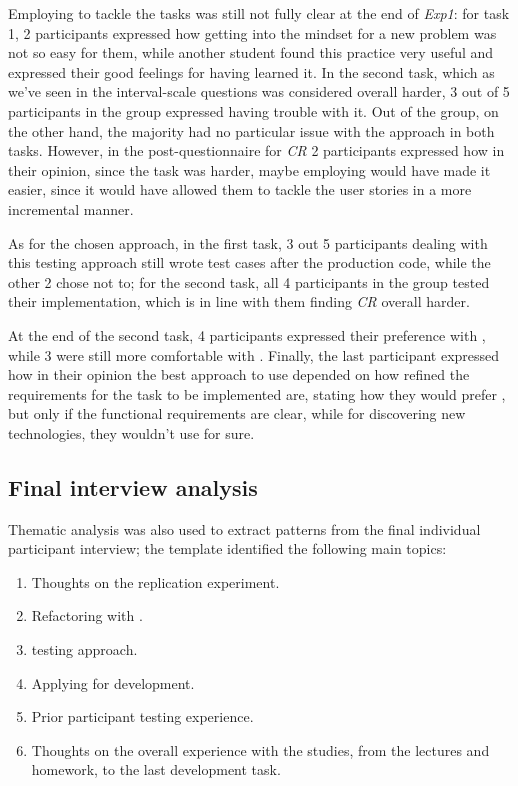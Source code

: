 Employing \tdd to tackle the tasks was still not fully clear at the end of \textit{Exp1}: for task 1, 2 participants expressed how getting into the \tdd mindset for a new problem was not so easy for them, while another student found this practice very useful and expressed their good feelings for having learned it. 
In the second task, which as we've seen in the interval-scale questions was considered overall harder, 3 out of 5 participants in the \tdd group expressed having trouble with it.
Out of the \notdd group, on the other hand, the majority had no particular issue with the approach in both tasks.
However, in the post-questionnaire for \textit{CR} 2 participants expressed how in their opinion, since the task was harder, maybe employing \tdd would have made it easier, since it would have allowed them to tackle the user stories in a more incremental manner.

As for the chosen \notdd approach, in the first task, 3 out 5 participants dealing with this testing approach still wrote test cases after the production code, while the other 2 chose not to; for the second task, all 4 participants in the \notdd group tested their implementation, which is in line with them finding \textit{CR} overall harder.

At the end of the second task, 4 participants expressed their preference with \tdd, while 3 were still more comfortable with \notdd. Finally, the last participant expressed how in their opinion the best approach to use depended on how refined the requirements for the task to be implemented are, stating how they would prefer \tdd, but only if the functional requirements are clear, while for discovering new technologies, they wouldn't use \tdd for sure.



\subsection{Final interview analysis}
Thematic analysis was also used to extract patterns from the final individual participant interview; the template identified the following main topics: 
\begin{enumerate}
    \item Thoughts on the replication experiment.
    \item Refactoring with \tdd.
    \item \notdd testing approach.
    \item Applying \tdd for \ess development.
    \item Prior participant testing experience.
    \item Thoughts on the overall experience with the studies, from the lectures and homework, to the last development task.
\end{enumerate}

